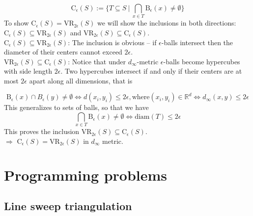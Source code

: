 \documentclass[a4paper,11pt]{article}
\begin{document}
$$\text{C}_{\epsilon}(S) := \{T\subseteq S~|~\bigcap_{x\in T} \text{B}_{\epsilon}(x) \neq \emptyset \}$$
To show $\text{C}_{\epsilon}(S) = \text{VR}_{2\epsilon}(S)$ we will show the inclusions in both directions: $\text{C}_{\epsilon}(S) \subseteq \text{VR}_{2 \epsilon}(S)$ and $\text{VR}_{2 \epsilon}(S) \subseteq  \text{C}_{\epsilon}(S)$.
\\
$\text{C}_{\epsilon}(S) \subseteq \text{VR}_{2 \epsilon}(S)$: The inclusion is obvious -- if $\epsilon$-balls intersect then the diameter of their centers cannot exceed $2 \epsilon$.
\\
$\text{VR}_{2 \epsilon}(S) \subseteq  \text{C}_{\epsilon}(S)$: Notice that under $d_{\infty}$-metric $\epsilon$-balls become hypercubes with side length $2\epsilon$. Two hypercubes intersect if and only if their centers are at most $2 \epsilon$ apart along all dimensions, that is

$$\text{B}_{\epsilon}(x) \cap B_{\epsilon}(y) \neq \emptyset \iff  d(x_i,y_i)\le 2\epsilon, \text{where} (x_i, y_i) \in \mathbb{R}^d \iff d_{\infty}(x,y)\le 2\epsilon$$
\noindent
This generalizes to sets of balls, so that we have
$$ \bigcap_{x\in T} \text{B}_{\epsilon}(x)\neq\emptyset \iff \text{diam}(T)\le 2\epsilon $$
\noindent
This proves the inclusion $\text{VR}_{2 \epsilon}(S) \subseteq \text{C}_{\epsilon}(S)$.
\\
\noindent
$\Rightarrow$ $\text{C}_{\epsilon}(S) = \text{VR}_{2\epsilon}(S)$ in $d_{\infty}$ metric.


\section{Programming problems}

\subsection{Line sweep triangulation}
\end{document}
